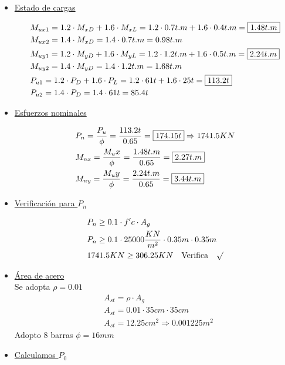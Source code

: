 \begin{enumerate}
\begin{itemize}
\item \underline{Estado de cargas}

\begin{align*}
& M_{ux1} = 1.2 \cdot M_{xD} + 1.6 \cdot M_{xL} = 1.2 \cdot 0.7 t.m + 1.6 \cdot 0.4 t.m = \framebox{$1.48t.m$}\\
& M_{ux2} = 1.4 \cdot M_{xD} = 1.4 \cdot 0.7 t.m = 0.98t.m\\
& M_{uy1} = 1.2 \cdot M_{yD} + 1.6 \cdot M_{yL} = 1.2 \cdot 1.2 t.m + 1.6 \cdot 0.5 t.m = \framebox{$2.24t.m$}\\
& M_{uy2} = 1.4 \cdot M_{yD} = 1.4 \cdot 1.2 t.m = 1.68t.m\\
& P_{u1} = 1.2 \cdot P_D + 1.6 \cdot P_L = 1.2 \cdot 61 t + 1.6 \cdot 25 t = \framebox{$113.2t$}\\
& P_{u2} = 1.4 \cdot P_D = 1.4 \cdot 61 t = 85.4t\\
\end{align*}

\item \underline{Esfuerzos nominales}

\begin{align*}
& P_n = \frac{P_u}{\phi} = \frac{113.2 t}{0.65} = \framebox{$174.15t$} \Rightarrow 1741.5 KN\\
& M_{nx} = \frac{M_ux}{\phi} = \frac{1.48 t.m}{0.65} = \framebox{$2.27t.m$}\\
& M_{ny} = \frac{M_uy}{\phi} = \frac{2.24 t.m}{0.65} = \framebox{$3.44t.m$}
\end{align*}

\item \underline{Verificación para $P_n$}

\begin{align*}
& P_n \geq 0.1 \cdot f'c \cdot A_g\\
& P_n \geq 0.1 \cdot 25000 \frac{KN}{m^2} \cdot 0.35m \cdot 0.35m\\
& 1741.5 KN \geq 306.25 KN \quad \text{Verifica} \quad \surd
\end{align*}

\item \underline{Área de acero}\\
Se adopta $\rho = 0.01$\\
\begin{align*}
& A_{st} = \rho \cdot A_g\\
& A_{st} = 0.01 \cdot 35cm \cdot 35cm\\
& A_{st} = 12.25 cm^2 \Rightarrow 0.001225m^2
\end{align*}
Adopto 8 barras $\phi = 16 mm$
\item \underline{Calculamos $P_0$}


\end{itemize}
\end{enumerate}
